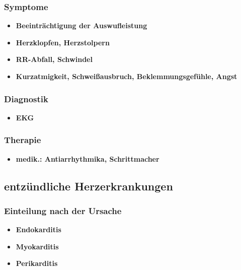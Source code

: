 		\subsubsection*{Symptome}
			\begin{itemize}
				\item \textbf{Beeinträchtigung der Auswufleistung}
				\item \textbf{Herzklopfen, Herzstolpern}
				\item \textbf{RR-Abfall, Schwindel}
				\item \textbf{Kurzatmigkeit, Schweißausbruch, Beklemmungsgefühle, Angst}
			\end{itemize}
		\subsubsection*{Diagnostik}
			\begin{itemize}
				\item \textbf{EKG}
			\end{itemize}
		\subsubsection*{Therapie}
			\begin{itemize}
				\item \textbf{medik.: Antiarrhythmika, Schrittmacher}
			\end{itemize}
	\subsection*{entzündliche Herzerkrankungen}
		\subsubsection*{Einteilung nach der Ursache}
			\begin{itemize}
				\item \textbf{Endokarditis}
				\item \textbf{Myokarditis}
				\item \textbf{Perikarditis}
			\end{itemize}
